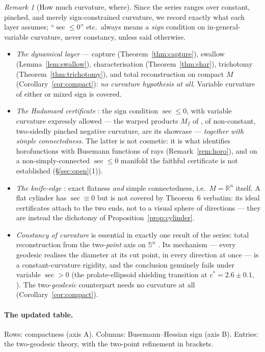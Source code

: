 \documentclass[11pt]{article}
\theoremstyle{remark}
\newtheorem{remark}[theorem]{Remark}
\newcommand{\R}{\mathbb{R}}
\newcommand{\sect}{\operatorname{sec}}
\newcommand{\Sn}{\mathbb{S}^{n}}
\begin{document}
\begin{remark}[How much curvature, where]\label{rem:curvhyp}
Since the series ranges over constant, pinched, and merely
sign-constrained curvature, we record exactly what each layer assumes;
``$\sect\le0$'' etc.\ always means a \emph{sign} condition on
in-general-variable curvature, never constancy, unless said otherwise.
\begin{itemize}
\item\emph{The dynamical layer} --- capture
(Theorem~\ref{thm:capture}), swallow (Lemma~\ref{lem:swallow}),
characterisation (Theorem~\ref{thm:char}), trichotomy
(Theorem~\ref{thm:trichotomy}), and total reconstruction on compact
$M$ (Corollary~\ref{cor:compact}): \emph{no curvature hypothesis at
all}. Variable curvature of either or mixed sign is covered.
\item\emph{The Hadamard certificate} \cite{R3}: the sign condition
$\sect\le0$, with variable curvature expressly allowed --- the warped
products $M_{f}$ of \cite[\S5]{R3}, of non-constant, two-sidedly
pinched negative curvature, are its showcase --- \emph{together with
simple connectedness}. The latter is not cosmetic: it is what
identifies horofunctions with Busemann functions of rays
(Remark~\ref{rem:horo}), and on a non-simply-connected $\sect\le0$
manifold the faithful certificate is not established
(\S\ref{sec:open}(1)).
\item\emph{The knife-edge} \cite{Bia}: exact flatness \emph{and}
simple connectedness, i.e.\ $M=\R^{n}$ itself. A flat cylinder has
$\sect\equiv0$ but is not covered by Theorem~6 verbatim: its ideal
certificates attach to the two ends, not to a visual sphere of
directions --- they are instead the dichotomy of
Proposition~\ref{prop:cylinder}.
\item\emph{Constancy of curvature} is essential in exactly one result
of the series: total reconstruction from the two-\emph{point} axis on
$\Sn$ \cite[Thm.~4.1]{Sph}. Its mechanism --- every geodesic realises
the diameter at its cut point, in every direction at once --- is a
constant-curvature rigidity, and the conclusion genuinely fails under
variable $\sect>0$ (the prolate-ellipsoid shielding transition at
$c^{\ast}=2.6\pm0.1$, \cite[Rem.~6.6]{Tri}). The two-\emph{geodesic}
counterpart needs no curvature at all
(Corollary~\ref{cor:compact}).
\end{itemize}
\end{remark}

\paragraph{The updated table.} Rows: compactness (axis A). Columns:
Busemann--Hessian sign (axis B). Entries: the two-geodesic theory,
with the two-point refinement in brackets.
\end{document}
